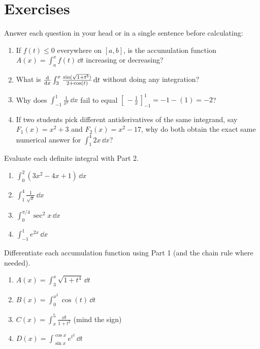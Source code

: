 \section{Exercises}

\begin{exercise}
Answer each question in your head or in a single sentence before calculating:
\begin{enumerate}[label=(\alph*)]
  \item If $f(t) \le 0$ everywhere on $[a,b]$, is the accumulation function $A(x)=\int_a^x f(t)\,\dd t$ increasing or decreasing?
  \item What is $\frac{\mathrm{d} }{\mathrm{d} x}\int_3^x \frac{\sin(\sqrt{1+t^5})}{2+\cos(t)}\,\mathrm{d} t$ without doing any integration?
  \item Why does $\int_{-1}^1 \frac{1}{x^2}\,\dd x$ fail to equal $[\,-\tfrac{1}{x}\,]_{-1}^1 = -1 - (1) = -2$?
  \item If two students pick different antiderivatives of the same integrand, say $F_1(x) = x^2 + 3$ and $F_2(x) = x^2 - 17$, why do both obtain the exact same numerical answer for $\int_1^4 2x\,\dd x$?
\end{enumerate}
\end{exercise}

\begin{exercise}
Evaluate each definite integral with Part 2.
\begin{enumerate}[label=(\alph*)]
  \item $\displaystyle\int_0^2 (3x^2 - 4x + 1)\,\dd x$
  \item $\displaystyle\int_1^4 \frac{1}{\sqrt{x}}\,\dd x$
  \item $\displaystyle\int_0^{\pi/4}\sec^2 x\,\dd x$
  \item $\displaystyle\int_{-1}^{1} e^{2x}\,\dd x$
\end{enumerate}
\end{exercise}

\begin{exercise}
Differentiate each accumulation function using Part 1 (and the chain rule where
needed).
\begin{enumerate}[label=(\alph*)]
  \item $\displaystyle A(x)=\int_3^x \sqrt{1+t^4}\,\dd t$
  \item $\displaystyle B(x)=\int_0^{x^2} \cos(t)\,\dd t$
  \item $\displaystyle C(x)=\int_x^{5} \frac{\dd t}{1+t^2}$ (mind the sign)
  \item $\displaystyle D(x)=\int_{\sin x}^{\cos x} e^{t^2}\,\dd t$
\end{enumerate}
\end{exercise}

